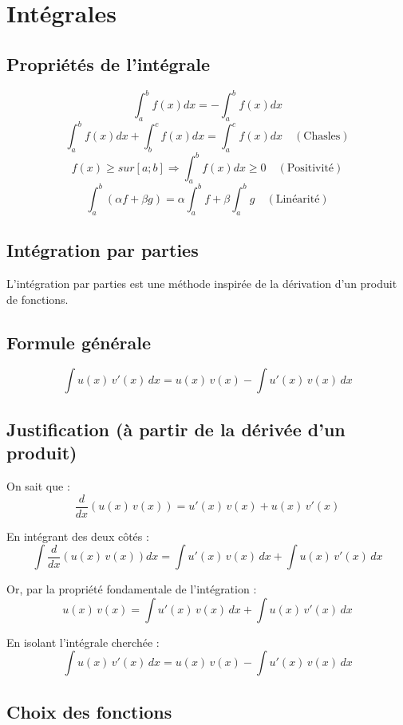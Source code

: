\documentclass[12]{article}%
\theoremstyle{plain}
\theoremstyle{definition}
\theoremstyle{remark}
\begin{document}
\begin{longtable}{|c|c|c|}
\end{longtable}

\newpage
\section{Intégrales}
\subsection{Propriétés de l'intégrale}

\[ \boxed{\int_{a}^{b} f(x)dx = -\int_{a}^{b}f(x)dx} \]
\[ \boxed{\int_{a}^{b} f(x)dx + \int_{b}^{c} f(x)dx = \int_{a}^{c} f(x)dx \quad (\text{Chasles})} \]
\[ \boxed{f(x) \geq sur [a;b] \Rightarrow \int_{a}^{b} f(x)dx \geq 0 \quad (\text{Positivité})} \]
\[ \boxed{\int_{a}^{b} (\alpha f+\beta g) = \alpha \int_{a}^{b}f + \beta \int_{a}^{b} g \quad (\text{Linéarité})} \]


\subsection{Intégration par parties}
L'intégration par parties est une méthode inspirée de la dérivation d'un produit de fonctions.

\subsection*{Formule générale}

\[
\boxed{\int u(x)\,v'(x)\,dx = u(x)\,v(x) - \int u'(x)\,v(x)\,dx}
\]

\subsection*{Justification (à partir de la dérivée d’un produit)}

On sait que :
\[
\frac{d}{dx} \left( u(x)\,v(x) \right) = u'(x)\,v(x) + u(x)\,v'(x)
\]

En intégrant des deux côtés :
\[
\int \frac{d}{dx} \left( u(x)\,v(x) \right) dx = \int u'(x)\,v(x)\,dx + \int u(x)\,v'(x)\,dx
\]

Or, par la propriété fondamentale de l'intégration :
\[
u(x)\,v(x) = \int u'(x)\,v(x)\,dx + \int u(x)\,v'(x)\,dx
\]

En isolant l'intégrale cherchée :
\[
\int u(x)\,v'(x)\,dx = u(x)\,v(x) - \int u'(x)\,v(x)\,dx
\]

\subsection*{Choix des fonctions}
\end{document}
